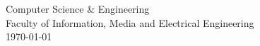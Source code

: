 \begin{titlepage}
    
    {\large Computer Science \& Engineering} \\
      {Faculty of Information, Media and Electrical Engineering}\\[2cm]
    {\large \today}\\[2cm] %
    
    
    \vfill %
    
    \end{titlepage}